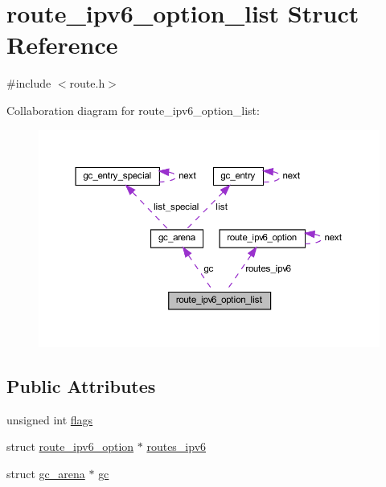 \hypertarget{structroute__ipv6__option__list}{}\section{route\+\_\+ipv6\+\_\+option\+\_\+list Struct Reference}
\label{structroute__ipv6__option__list}


{\ttfamily \#include $<$route.\+h$>$}



Collaboration diagram for route\+\_\+ipv6\+\_\+option\+\_\+list\+:
\nopagebreak
\begin{figure}[H]
\begin{center}
\leavevmode
\includegraphics[width=350pt]{structroute__ipv6__option__list__coll__graph}
\end{center}
\end{figure}
\subsection*{Public Attributes}
\begin{DoxyCompactItemize}
\item 
unsigned int \hyperlink{structroute__ipv6__option__list_a04b38996423c8facdac8c843fae37a17}{flags}
\item 
struct \hyperlink{structroute__ipv6__option}{route\+\_\+ipv6\+\_\+option} $\ast$ \hyperlink{structroute__ipv6__option__list_ae6e9d82445e90200af8a91ed3baadbec}{routes\+\_\+ipv6}
\item 
struct \hyperlink{structgc__arena}{gc\+\_\+arena} $\ast$ \hyperlink{structroute__ipv6__option__list_a8dcffed95f93c2a93747de1d9e165999}{gc}
\end{DoxyCompactItemize}



